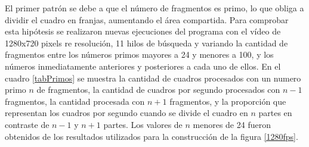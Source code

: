 El primer patrón se debe a que el número de fragmentos es primo, lo que obliga a
dividir el cuadro en franjas, aumentando el área compartida. Para comprobar esta
hipótesis se realizaron nuevas ejecuciones del programa con el vídeo de 1280x720
pixels re resolución, 11 hilos de búsqueda y variando la cantidad de fragmentos
entre los números primos mayores a 24 y menores a 100, y los números
inmediatamente anteriores y posteriores a cada uno de ellos. En el cuadro
\ref{tabPrimos} se muestra la cantidad de cuadros procesados con un numero primo
$n$ de fragmentos, la cantidad de cuadros por segundo procesados con $n-1$
fragmentos, la cantidad procesada con $n+1$ fragmentos, y la proporción que
representan los cuadros por segundo cuando se divide el cuadro en $n$ partes en
contraste de $n-1$ y $n+1$ partes. Los valores de $n$ menores de 24 fueron
obtenidos de los resultados utilizados para la construcción de la figura
\ref{1280fps}.

